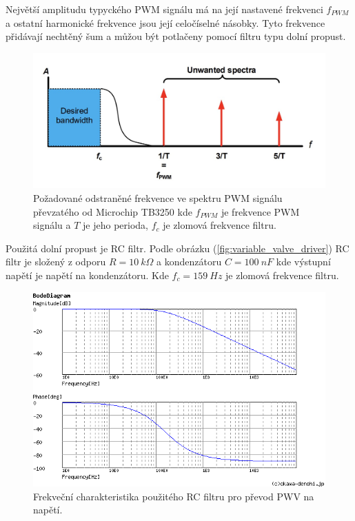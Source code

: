 Největší amplitudu typyckého PWM signálu má na její nastavené frekvenci $f_{PWM}$ a ostatní harmonické frekvence jsou její celočíselné násobky. Tyto frekvence přidávají nechtěný šum a můžou být potlačeny pomocí filtru typu dolní propust.


\begin{figure}[H]
    \centering
    \includegraphics[width=1\linewidth]{pictures/rc_pwm_spectrum_microchip90003250A.jpg}
    \caption{Požadované odstraněné frekvence ve spektru PWM signálu převzatého od Microchip TB3250 kde $f_{PWM}$ je frekvence PWM signálu a $T$ je jeho perioda, $f_{c}$ je zlomová frekvence filtru.\cite{cite:MCPPWV}}
    \label{fig:unwanted_pwm_spectrum}
\end{figure}

Použitá dolní propust je RC filtr. Podle obrázku (\ref{fig:variable_valve_driver}) RC filtr je složený z odporu $R = 10 \ k\Omega$ a kondenzátoru $C = 100 \ nF$ kde výstupní napětí je napětí na kondenzátoru.
Kde $f_c = 159 \ Hz$ je zlomová frekvence filtru.

\begin{figure}[H]
    \centering
    \includegraphics[width=1\linewidth]{pictures/var_rc_filter.png}
    \caption{Frekveční charakteristika použitého RC filtru pro převod PWV na napětí.\cite{cite:RCResponse}}
    \label{fig:var_rc_filter_char}
\end{figure}

